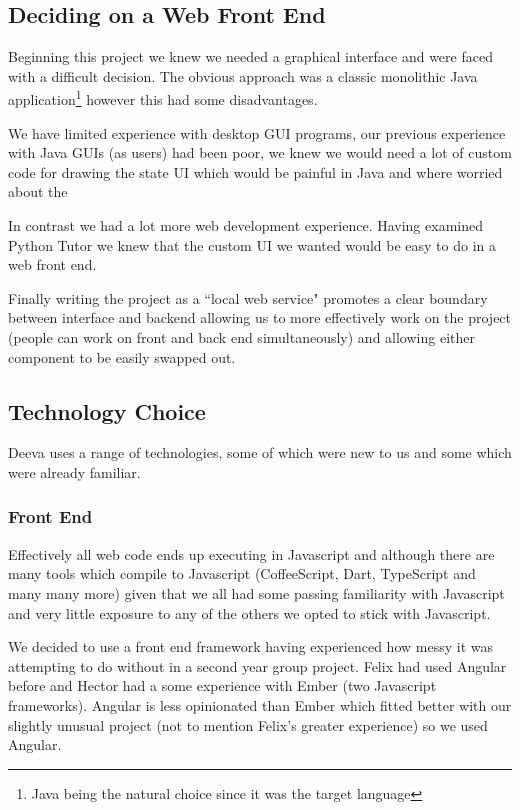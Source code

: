 \documentclass[11pt, a4paper]{article}
\begin{document}
\subsection{Deciding on a Web Front End}
Beginning this project we knew we needed a graphical interface and were faced with a difficult decision.
The obvious approach was a classic monolithic Java application\footnote{Java being the natural choice since it was the target language} however this had some disadvantages. 

We have limited experience with desktop GUI programs, our previous experience with Java GUIs (as users) had been poor, 
we knew we would need a lot of custom code for drawing the state UI which would be painful in Java and where worried about the 

In contrast we had a lot more web development experience.
Having examined Python Tutor we knew that the custom UI we wanted would be easy to do in a web front end.

Finally writing the project as a ``local web service" promotes a clear boundary between interface and backend allowing us to more effectively work on the project (people can work on front and back end simultaneously) and allowing either component to be easily swapped out.



\subsection{Technology Choice}
Deeva uses a range of technologies, some of which were new to us and some which were already familiar.

\subsubsection{Front End}
Effectively all web code ends up executing in Javascript and although there are many tools which compile to Javascript (CoffeeScript, Dart, TypeScript and many many more) given that we all had some passing familiarity with Javascript and very little exposure to any of the others we opted to stick with Javascript.

We decided to use a front end framework having experienced how messy it was attempting to do without in a second year group project.
Felix had used Angular before and Hector had a some experience with Ember (two Javascript frameworks).
Angular is less opinionated than Ember which fitted better with our slightly unusual project (not to mention Felix's greater experience) so we used Angular.
\end{document}
